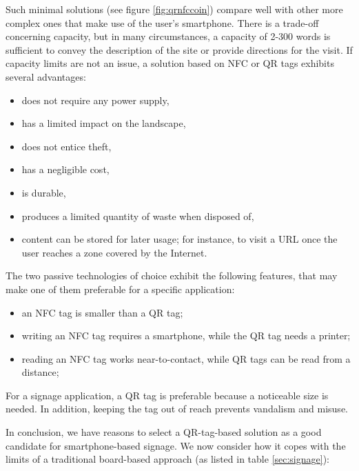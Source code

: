 \documentclass[sustainability,article,submit,pdftex,moreauthors]{Definitions/mdpi}
\begin{document}
Such minimal solutions (see figure \ref{fig:qrnfccoin}) compare well with other more complex ones that make use of the user's smartphone. There is a trade-off concerning capacity, but in many circumstances, a capacity of 2-300 words is sufficient to convey the description of the site or provide directions for the visit. If capacity limits are not an issue, a solution based on NFC or QR tags exhibits several advantages:

\begin{itemize} 
\item does not require any power supply,
\item has a limited impact on the landscape,
\item does not entice theft,
\item has a negligible cost,
\item is durable,
\item produces a limited quantity of waste when disposed of,
\item content can be stored for later usage; for instance, to visit a URL once the user reaches a zone covered by the Internet.
\end{itemize}

The two passive technologies of choice exhibit the following features, that may make one of them preferable for a specific application:

\begin{itemize}
	\item an NFC tag is smaller than a QR tag;
	\item writing an NFC tag requires a smartphone, while the QR tag needs a printer;
	\item reading an NFC tag works near-to-contact, while QR tags can be read from a distance;
\end{itemize}


For a signage application, a QR tag is preferable because a noticeable size is needed. In addition, keeping the tag out of reach prevents vandalism and misuse.  

In conclusion, we have reasons to select a QR-tag-based solution as a good candidate for smartphone-based signage. We now consider how it copes with the limits of a traditional board-based approach (as listed in table \ref{sec:signage}):
\end{document}
